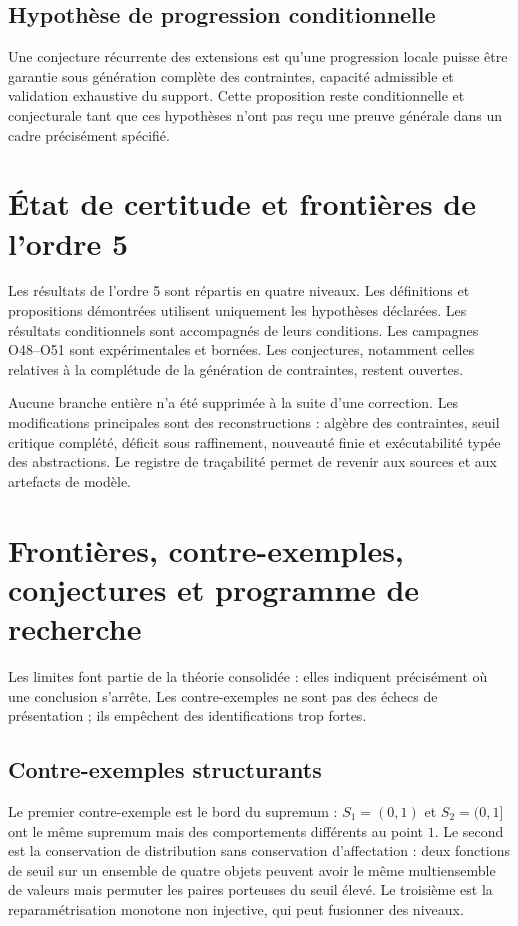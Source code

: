 \documentclass[11pt,a4paper,openany]{book}
\begin{document}
\section{Hypothèse de progression conditionnelle}
Une conjecture récurrente des extensions est qu'une progression locale puisse être garantie sous génération complète des contraintes, capacité admissible et validation exhaustive du support. Cette proposition reste conditionnelle et conjecturale tant que ces hypothèses n'ont pas reçu une preuve générale dans un cadre précisément spécifié.


\chapter{État de certitude et frontières de l'ordre 5}
Les résultats de l'ordre 5 sont répartis en quatre niveaux. Les définitions et propositions démontrées utilisent uniquement les hypothèses déclarées. Les résultats conditionnels sont accompagnés de leurs conditions. Les campagnes O48--O51 sont expérimentales et bornées. Les conjectures, notamment celles relatives à la complétude de la génération de contraintes, restent ouvertes.

Aucune branche entière n'a été supprimée à la suite d'une correction. Les modifications principales sont des reconstructions : algèbre des contraintes, seuil critique complété, déficit sous raffinement, nouveauté finie et exécutabilité typée des abstractions. Le registre de traçabilité permet de revenir aux sources et aux artefacts de modèle.

\chapter{Frontières, contre-exemples, conjectures et programme de recherche}

Les limites font partie de la théorie consolidée : elles indiquent précisément où une conclusion s'arrête. Les contre-exemples ne sont pas des échecs de présentation ; ils empêchent des identifications trop fortes.

\section{Contre-exemples structurants}
Le premier contre-exemple est le bord du supremum : $S_1=(0,1)$ et $S_2=(0,1]$ ont le même supremum mais des comportements différents au point $1$. Le second est la conservation de distribution sans conservation d'affectation : deux fonctions de seuil sur un ensemble de quatre objets peuvent avoir le même multiensemble de valeurs mais permuter les paires porteuses du seuil élevé. Le troisième est la reparamétrisation monotone non injective, qui peut fusionner des niveaux.
\end{document}
